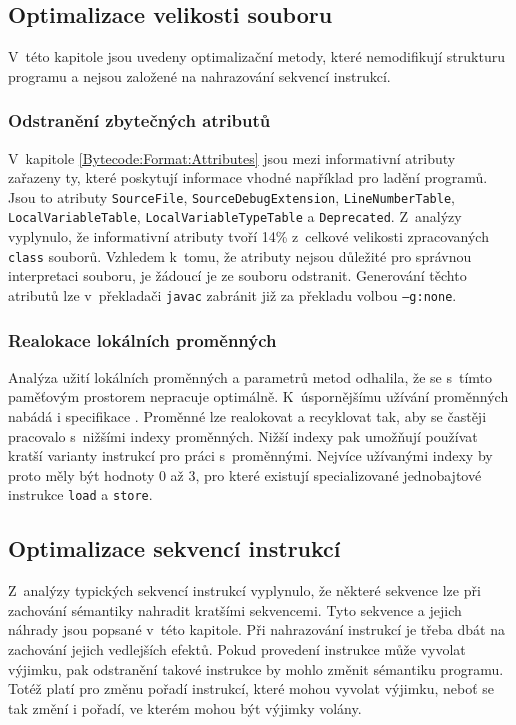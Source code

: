 \subsection{Optimalizace velikosti souboru}

V~této kapitole jsou uvedeny optimalizační metody, které nemodifikují strukturu programu a nejsou založené na nahrazování sekvencí instrukcí.


\subsubsection{Odstranění zbytečných atributů}
V~kapitole \ref{Bytecode:Format:Attributes} jsou mezi informativní atributy zařazeny ty, které poskytují informace vhodné například pro ladění programů. Jsou to atributy \texttt{SourceFile}, \texttt{SourceDebugExtension}, \texttt{LineNumberTable}, \texttt{LocalVariableTable}, \texttt{LocalVariableTypeTable} a \texttt{Deprecated}.  Z~analýzy vyplynulo, že informativní atributy tvoří 14\% z~celkové velikosti zpracovaných \texttt{class} souborů. Vzhledem k~tomu, že atributy nejsou důležité pro správnou interpretaci souboru, je žádoucí je ze souboru odstranit. Generování těchto atributů lze v~překladači \texttt{javac} zabránit již za překladu volbou \texttt{--g:none}.

\subsubsection{Realokace lokálních proměnných}
Analýza užití lokálních proměnných a parametrů metod odhalila, že se s~tímto paměťovým prostorem nepracuje optimálně. K~úspornějšímu užívání proměnných nabádá i specifikace \cite{Lindholm:JVM}. Proměnné lze realokovat a recyklovat tak, aby se častěji pracovalo s~nižšími indexy proměnných. Nižší indexy pak umožňují používat kratší varianty instrukcí pro práci s~proměnnými. Nejvíce užívanými indexy by proto měly být hodnoty 0 až 3, pro které existují specializované jednobajtové instrukce \texttt{load} a \texttt{store}. 


\subsection{Optimalizace sekvencí instrukcí}

Z~analýzy typických sekvencí instrukcí vyplynulo, že některé sekvence lze při zachování sémantiky nahradit kratšími sekvencemi.
Tyto sekvence a jejich náhrady jsou popsané v~této kapitole.
Při nahrazování instrukcí je třeba dbát na zachování jejich vedlejších efektů. Pokud provedení instrukce může vyvolat výjimku, pak odstranění takové instrukce by mohlo změnit sémantiku programu. Totéž platí pro změnu pořadí instrukcí, které mohou vyvolat výjimku, neboť se tak změní i pořadí, ve kterém mohou být výjimky volány.


